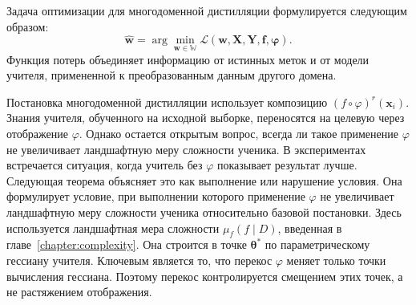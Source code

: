Задача оптимизации для многодоменной дистилляции формулируется следующим образом:
$$\hat{\mathbf{w}} = \arg\min_{\mathbf{w} \in \mathbb{W}} \mathcal{L}(\mathbf{w,X,Y,f,\varphi} ).$$
Функция потерь объединяет информацию от истинных меток и от модели учителя, примененной к преобразованным данным другого домена.

Постановка многодоменной дистилляции использует композицию $(f\circ\varphi)^r(\mathbf{x}_i)$.
Знания учителя, обученного на исходной выборке, переносятся на целевую через отображение $\varphi$.
Однако остается открытым вопрос, всегда ли такое применение $\varphi$ не увеличивает ландшафтную меру сложности ученика.
В экспериментах встречается ситуация, когда учитель без $\varphi$ показывает результат лучше.
Следующая теорема объясняет это как выполнение или нарушение условия.
Она формулирует условие, при выполнении которого применение $\varphi$ не увеличивает ландшафтную меру сложности ученика относительно базовой постановки.
Здесь используется ландшафтная мера сложности $\mu_f(f\mid D)$, введенная в главе~\ref{chapter:complexity}.
Она строится в точке $\boldsymbol{\theta}^*$ по параметрическому гессиану учителя.
Ключевым является то, что перекос $\varphi$ меняет только точки вычисления гессиана.
Поэтому перекос контролируется смещением этих точек, а не растяжением отображения.

